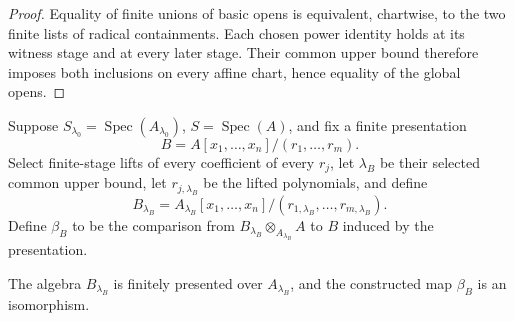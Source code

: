 \begin{proof}
  Equality of finite unions of basic opens is equivalent, chartwise, to the
  two finite lists of radical containments.  Each chosen power identity holds
  at its witness stage and at every later stage.  Their common upper bound
  therefore imposes both inclusions on every affine chart, hence equality of
  the global opens.
\end{proof}

\begin{definition}
  \label{def:nagata-affine-fp-descent}

  Suppose $S_{\lambda_0}=\operatorname{Spec}(A_{\lambda_0})$,
  $S=\operatorname{Spec}(A)$, and fix a finite presentation
  \[
    B=A[x_1,\ldots,x_n]/(r_1,\ldots,r_m).
  \]
  Select finite-stage lifts of every coefficient of every $r_j$, let
  $\lambda_B$ be their selected common upper bound, let
  $r_{j,\lambda_B}$ be the lifted polynomials, and define
  \[
    B_{\lambda_B}
      =A_{\lambda_B}[x_1,\ldots,x_n]/
        (r_{1,\lambda_B},\ldots,r_{m,\lambda_B}).
  \]
  Define $\beta_B$ to be the comparison from
  $B_{\lambda_B}\otimes_{A_{\lambda_B}}A$ to $B$ induced by the presentation.
\end{definition}

\begin{lemma}
  \label{lemma:nagata-affine-fp-descends}

  The algebra $B_{\lambda_B}$ is finitely presented over
  $A_{\lambda_B}$, and the constructed map $\beta_B$ is an isomorphism.
\end{lemma}

